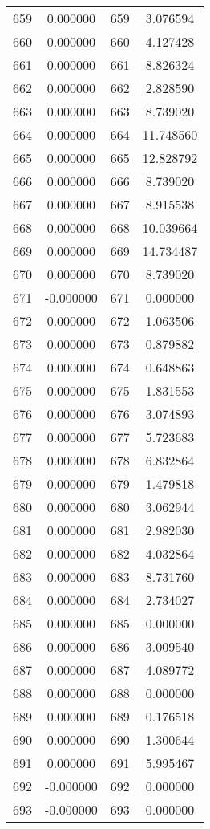\documentclass[12pt]{article}
\begin{document}
\begin{longtable}{@{}cccc@{}}
659 & 0.000000 & 659 & 3.076594 \\
660 & 0.000000 & 660 & 4.127428 \\
661 & 0.000000 & 661 & 8.826324 \\
662 & 0.000000 & 662 & 2.828590 \\
663 & 0.000000 & 663 & 8.739020 \\
664 & 0.000000 & 664 & 11.748560 \\
665 & 0.000000 & 665 & 12.828792 \\
666 & 0.000000 & 666 & 8.739020 \\
667 & 0.000000 & 667 & 8.915538 \\
668 & 0.000000 & 668 & 10.039664 \\
669 & 0.000000 & 669 & 14.734487 \\
670 & 0.000000 & 670 & 8.739020 \\
671 & -0.000000 & 671 & 0.000000 \\
672 & 0.000000 & 672 & 1.063506 \\
673 & 0.000000 & 673 & 0.879882 \\
674 & 0.000000 & 674 & 0.648863 \\
675 & 0.000000 & 675 & 1.831553 \\
676 & 0.000000 & 676 & 3.074893 \\
677 & 0.000000 & 677 & 5.723683 \\
678 & 0.000000 & 678 & 6.832864 \\
679 & 0.000000 & 679 & 1.479818 \\
680 & 0.000000 & 680 & 3.062944 \\
681 & 0.000000 & 681 & 2.982030 \\
682 & 0.000000 & 682 & 4.032864 \\
683 & 0.000000 & 683 & 8.731760 \\
684 & 0.000000 & 684 & 2.734027 \\
685 & 0.000000 & 685 & 0.000000 \\
686 & 0.000000 & 686 & 3.009540 \\
687 & 0.000000 & 687 & 4.089772 \\
688 & 0.000000 & 688 & 0.000000 \\
689 & 0.000000 & 689 & 0.176518 \\
690 & 0.000000 & 690 & 1.300644 \\
691 & 0.000000 & 691 & 5.995467 \\
692 & -0.000000 & 692 & 0.000000 \\
693 & -0.000000 & 693 & 0.000000 \\

\end{longtable}
\end{document}

